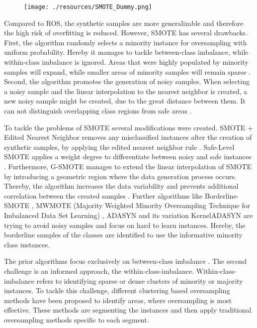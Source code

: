 \documentclass[parskip=full]{scrartcl}
\begin{document}
\begin{figure}[H]
	\centering
	\texttt{[image: ./resources/SMOTE\_Dummy.png]}
	\label{fig:Schubach}
\end{figure}

Compared to ROS, the synthetic samples are more generalizable and therefore the high risk of overfitting is 
reduced. However, SMOTE has several drawbacks. First, the algorithm randomly selects a minority instance 
for oversampling with uniform probability. Hereby it manages to tackle between-class imbalance, while 
within-class imbalance is ignored. Areas that were highly populated by minority samples will expand, while 
smaller areas of minority samples will remain sparse \cite{Prati2004}. Second, the algorithm promotes the 
generation of noisy samples. When selecting a noisy sample and the linear interpolation to the nearest 
neighbor is created, a new noisy sample might be created, due to the great distance between them. It can 
not distinguish overlapping class regions from safe areas \cite{Bunkhumpornpat2009}. 

To tackle the problems of SMOTE several modifications were created. SMOTE + Edited Nearest Neighbor removes any 
misclassified instances after the creation of synthetic samples, by applying the edited nearest neighbor 
rule \cite{Maria2004}. Safe-Level SMOTE applies a weight degree to differentiate between noisy and safe instances 
\cite{Bunkhumpornpat2009}. Furthermore, G-SMOTE manages to extend the linear interpolation of SMOTE by 
introducing a geometric region where the data generation process occurs. Thereby, the algorithm increases the 
data variability and prevents additional correlation between the created samples \cite{Douzas2017}. Further 
algorithms like Borderline-SMOTE \cite{Han2005}, MWMOTE (Majority Weighted Minority Oversampling Technique 
for Imbalanced Data Set Learning) \cite{Barua2014}, ADASYN and its variation KernelADASYN \cite{Tang2015} 
are trying to avoid noisy samples and focus on hard to learn instances. Hereby, the borderline samples of 
the classes are identified to use the informative minority class instances.

The prior algorithms focus exclusively on between-class imbalance \cite{Nekooeimehr2015}. The second challenge 
is an informed approach, the within-class-imbalance. Within-class-imbalance refers to identifying sparse or 
dense clusters of minority or majority instances. To tackle this challenge, different clustering based 
oversampling methods have been proposed to identify areas, where oversampling is most effective. These 
methods are segmenting the instances and then apply traditional oversampling methods specific to each segment. 
\end{document}
